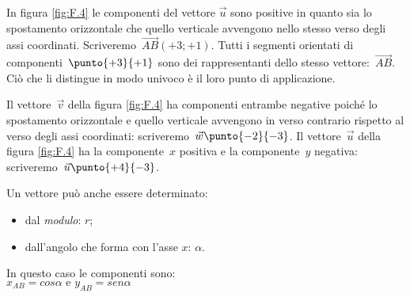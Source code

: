 In figura \ref{fig:F.4} le componenti del vettore \(\vec{u}\) sono positive 
in quanto sia lo spostamento orizzontale che quello verticale avvengono nello 
stesso verso degli assi coordinati. 
Scriveremo~\(\overrightarrow{AB}(+3;+1)\). 
Tutti i segmenti orientati di componenti~\(\punto{+3}{+1}\) sono 
dei rappresentanti dello stesso vettore:~\(\overrightarrow{AB}\).
Ciò che li distingue in modo univoco è il loro punto di applicazione.

\begin{esempio}
Il vettore~\(\vec{v}\) della figura \ref{fig:F.4} ha componenti entrambe 
negative poiché lo spostamento orizzontale e quello verticale avvengono 
in verso contrario rispetto al verso degli assi coordinati: 
scriveremo~\(\vec{w}\punto{-2}{-3}\). 
Il vettore~\(\vec{u}\) della figura \ref{fig:F.4} ha la componente~\(x\) positiva 
e la componente~\(y\) negativa: 
scriveremo~\(\vec{u}\punto{+4}{-3}\).
\end{esempio}
% 

\begin{minipage}{.49 \textwidth}
Un vettore può anche essere determinato:
\begin{itemize}
 \item dal \emph{modulo}: \(r\);
 \item dall'angolo che forma con l'asse \(x\): \(\alpha\).
\end{itemize}

In questo caso le componenti sono:\\
\(x_{AB} = cos \alpha \text{ e } y_{AB} = sen \alpha\)  
\end{minipage}
\hfill
\begin{minipage}{.49 \textwidth}
 \begin{inaccessibleblock}
 \begin{center}
  \vettorepolare
 \end{center}
\end{inaccessibleblock}
\end{minipage}


